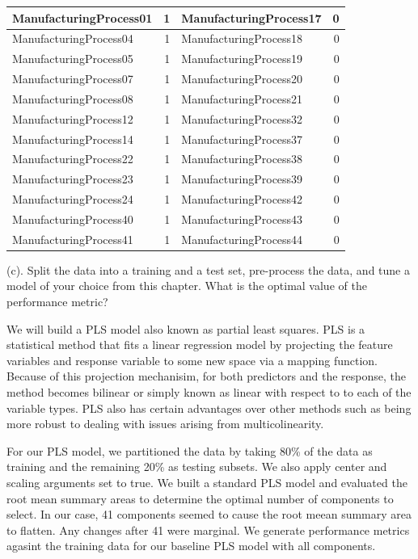 \documentclass[]{report}
\begin{document}
\begin{table}[H]
\begin{tabular}{l|r|l|r}
\hline
\rowcolor{gray!6}  ManufacturingProcess01 & 1 & ManufacturingProcess17 & 0\\
\hline
ManufacturingProcess04 & 1 & ManufacturingProcess18 & 0\\
\hline
\rowcolor{gray!6}  ManufacturingProcess05 & 1 & ManufacturingProcess19 & 0\\
\hline
ManufacturingProcess07 & 1 & ManufacturingProcess20 & 0\\
\hline
\rowcolor{gray!6}  ManufacturingProcess08 & 1 & ManufacturingProcess21 & 0\\
\hline
ManufacturingProcess12 & 1 & ManufacturingProcess32 & 0\\
\hline
\rowcolor{gray!6}  ManufacturingProcess14 & 1 & ManufacturingProcess37 & 0\\
\hline
ManufacturingProcess22 & 1 & ManufacturingProcess38 & 0\\
\hline
\rowcolor{gray!6}  ManufacturingProcess23 & 1 & ManufacturingProcess39 & 0\\
\hline
ManufacturingProcess24 & 1 & ManufacturingProcess42 & 0\\
\hline
\rowcolor{gray!6}  ManufacturingProcess40 & 1 & ManufacturingProcess43 & 0\\
\hline
ManufacturingProcess41 & 1 & ManufacturingProcess44 & 0\\
\hline
\end{tabular}
\end{table}

\begin{subquestion}{(c).} Split the data into a training and a test set, pre-process the data, and tune a model of your choice from this chapter. What is the optimal value of the performance metric? 
\end{subquestion}

We will build a PLS model also known as partial least squares. PLS is a
statistical method that fits a linear regression model by projecting the
feature variables and response variable to some new space via a mapping
function. Because of this projection mechanisim, for both predictors and
the response, the method becomes bilinear or simply known as linear with
respect to to each of the variable types. PLS also has certain
advantages over other methods such as being more robust to dealing with
issues arising from multicolinearity.

For our PLS model, we partitioned the data by taking 80\% of the data as
training and the remaining 20\% as testing subsets. We also apply center
and scaling arguments set to true. We built a standard PLS model and
evaluated the root mean summary areas to determine the optimal number of
components to select. In our case, 41 components seemed to cause the
root meean summary area to flatten. Any changes after 41 were marginal.
We generate performance metrics agasint the training data for our
baseline PLS model with all components.
\end{document}
